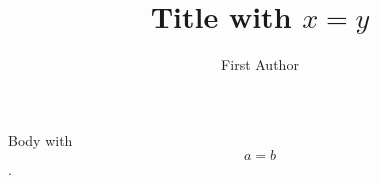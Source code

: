 \documentclass{llncs}
\title{Title with $x=y$}
\author{First Author\inst{1}}
\institute{First university}
\begin{document}
\maketitle
Body with \[a=b\].
\end{document}
